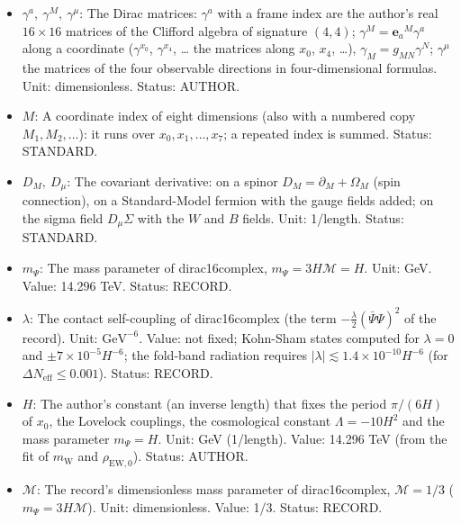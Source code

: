 \documentclass[
  10pt,
]{article}
\begin{document}
\begin{itemize}
  source of the dark matter (its lowest odd level) and of the massless
  fold bands; \(\bar\Psi = \Psi^\dagger C\) is its Dirac adjoint. Unit:
  \(\mathrm{GeV}^{7/2}\). Status: RECORD.
\item
  \(\gamma^a,\ \gamma^M,\ \gamma^\mu\): The Dirac matrices: \(\gamma^a\)
  with a frame index are the author's real \(16 \times 16\) matrices of
  the Clifford algebra of signature \((4, 4)\);
  \(\gamma^M = \mathbf{e}_a{}^M\gamma^a\) along a coordinate
  (\(\gamma^{x_0}\), \(\gamma^{x_4}\), \ldots{} the matrices along
  \(x_0\), \(x_4\), \ldots), \(\gamma_M = g_{MN}\gamma^N\);
  \(\gamma^\mu\) the matrices of the four observable directions in
  four-dimensional formulas. Unit: dimensionless. Status: AUTHOR.
\item
  \(M\): A coordinate index of eight dimensions (also with a numbered
  copy \(M_1, M_2, \dots\)): it runs over \(x_0, x_1, \dots, x_7\); a
  repeated index is summed. Status: STANDARD.
\item
  \(D_M,\ D_\mu\): The covariant derivative: on a spinor
  \(D_M = \partial_M + \Omega_M\) (spin connection), on a Standard-Model
  fermion with the gauge fields added; on the sigma field
  \(D_\mu\Sigma\) with the \(W\) and \(B\) fields. Unit: 1/length.
  Status: STANDARD.
\item
  \(m_\Psi\): The mass parameter of dirac16complex,
  \(m_\Psi = 3H\mathcal{M} = H\). Unit: GeV. Value: 14.296 TeV. Status:
  RECORD.
\item
  \(\lambda\): The contact self-coupling of dirac16complex (the term
  \(-\frac{\lambda}{2}(\bar\Psi\Psi)^2\) of the record). Unit:
  \(\mathrm{GeV}^{-6}\). Value: not fixed; Kohn-Sham states computed for
  \(\lambda = 0\) and \(\pm7\times10^{-5}H^{-6}\); the fold-band
  radiation requires
  \(\lvert\lambda\rvert \lesssim 1.4\times10^{-10}H^{-6}\) (for
  \(\Delta N_{\mathrm{eff}} \le 0.001\)). Status: RECORD.
\item
  \(H\): The author's constant (an inverse length) that fixes the period
  \(\pi/(6H)\) of \(x_0\), the Lovelock couplings, the cosmological
  constant \(\Lambda = -10H^2\) and the mass parameter \(m_\Psi = H\).
  Unit: GeV (1/length). Value: 14.296 TeV (from the fit of
  \(m_{\mathrm{W}}\) and \(\rho_{\mathrm{EW},0}\)). Status: AUTHOR.
\item
  \(\mathcal{M}\): The record's dimensionless mass parameter of
  dirac16complex, \(\mathcal{M} = 1/3\) (\(m_\Psi = 3H\mathcal{M}\)).
  Unit: dimensionless. Value: 1/3. Status: RECORD.
\end{itemize}
\end{document}
